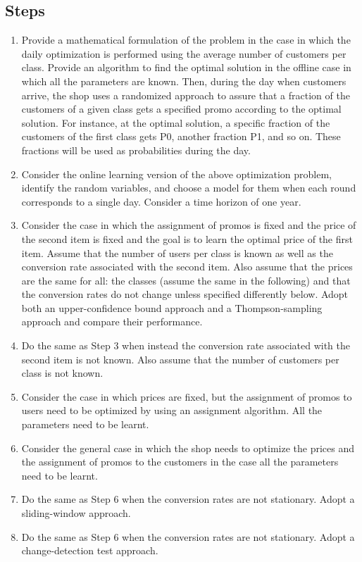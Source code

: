 \subsection*{Steps}
\begin{enumerate}
\item Provide a mathematical formulation of the problem in the case in which the daily optimization is performed using the average number of customers per class. Provide an algorithm to find the optimal solution in the offline case in which all the parameters are known. Then, during the day when customers arrive, the shop uses a randomized approach to assure that a fraction of the customers of a given class gets a specified promo according to the optimal solution. For instance, at the optimal solution, a specific fraction of the customers of the first class gets P0, another fraction P1, and so on. These fractions will be used as probabilities during the day.
\item Consider the online learning version of the above optimization problem, identify the random variables, and choose a model for them when each round corresponds to a single day. Consider a time horizon of one year.
\item Consider the case in which the assignment of promos is fixed and the price of the second item is fixed and the goal is to learn the optimal price of the first item. Assume that the number of users per class is known as well as the conversion rate associated with the second item. Also assume that the prices are the same for all: the classes (assume the same in the following) and that the conversion rates do not change unless specified differently below. Adopt both an upper-confidence bound approach and a Thompson-sampling approach and compare their performance.
\item Do the same as Step 3 when instead the conversion rate associated with the second item is not known. Also assume that the number of customers per class is not known.
\item Consider the case in which prices are fixed, but the assignment of promos to users need to be optimized by using an assignment algorithm. All the parameters need to be learnt. 
\item Consider the general case in which the shop needs to optimize the prices and the assignment of promos to the customers in the case all the parameters need to be learnt.
\item Do the same as Step 6 when the conversion rates are not stationary. Adopt a sliding-window approach.
\item Do the same as Step 6 when the conversion rates are not stationary. Adopt a change-detection test approach.
\end{enumerate}
